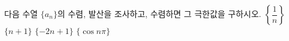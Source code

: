 다음 수열 $\{a_n\}$의 수렴, 발산을 조사하고, 수렴하면 그 극한값을 구하시오.
 $\left\{\dfrac{1}{n}\right\}$
 $\{n+1\}$
 $\{-2n+1\}$
 $\{\cos n\pi\}$
